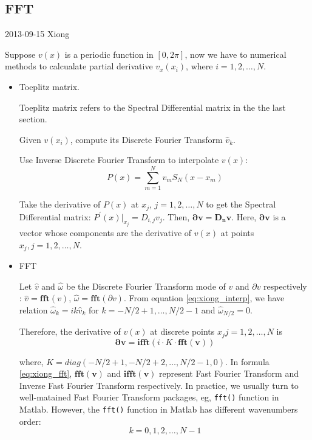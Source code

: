 \subsection{FFT}

\begin{description}
\item[2013-09-15 Xiong]
\end{description}



Suppose $v(x)$ is a periodic function in $[0,2\pi]$, now we have to numerical
methods to calcualate partial derivative $v_{x}(x_i)$, where $i=1,2,\dots , N$.

\begin{itemize}
 \item Toeplitz matrix.

 Toeplitz matrix refers to the Spectral Differential matrix in the the last section.

 Given $v(x_i)$, compute its Discrete Fourier Transform $\hat{v}_{k}$.

 Use Inverse Discrete Fourier Transform to interpolate $v(x)$:
 \[
 P(x)=\sum_{m=1}^{N}v_{m}S_{N}(x-x_{m})
\]

 Take the derivative of $P(x)$ at $x_{j}$,  $j=1,2,\dots , N$ to get the Spectral
 Differential matrix: $P^{'}(x)|_{x_{j}}=D_{i,j}v_{j}$. Then,
 $\mathbf{\partial v}=\mathbf{D_{n}}\mathbf{v}$. Here, $\mathbf{\partial v}$ is a vector
 whose components are the derivative of $v(x)$ at points $x_{j}, j=1,2,\dots , N$.

 \item FFT

 Let $\hat{v}$ and $\hat{\omega}$ be
 the Discrete Fourier Transform mode of $v$ and $\partial v$ respectively
 : $\hat{v}=\mathbf{fft}(v)$, $\hat{\omega}=\mathbf{fft}(\partial v)$.
 From equation \eqref{eq:xiong_interp}, we have
 relation $\hat{\omega}_{k}=ik\hat{v}_{k}$ for $k=-N/2+1,\dots , N/2-1$
 and $\hat{\omega}_{N/2}=0$.

 Therefore, the derivative of $v(x)$ at discrete points $x_{j} j=1,2,\dots , N$ is
 \begin{equation}
 \label{eq:xiong_fft}
  \mathbf{\partial v}=\mathbf{ifft}(i\cdot K\cdot \mathbf{fft(v)})
 \end{equation}

 where, $K=diag(-N/2+1,-N/2+2,\dots, N/2-1, 0)$. In formula \eqref{eq:xiong_fft},
 $\mathbf{fft(v)}$ and $\mathbf{ifft(v)}$ represent Fast Fourier Transform and
 Inverse Fast Fourier Transform respectively. In practice, we usually turn to
 well-matained Fast Fourier Transform packages, eg, \texttt{fft()} function in Matlab.
 However, the \texttt{fft()} function in Matlab has different wavenumbers order:
  \begin{equation}
  \label{eq:xiong_wavenumber_fft}
  k=0,1,2,\dots , N-1
 \end{equation}


\end{itemize}
